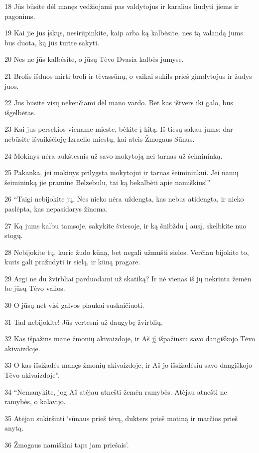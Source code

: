 \par 18 Jūs būsite dėl manęs vedžiojami pas valdytojus ir karalius liudyti jiems ir pagonims. 
\par 19 Kai jie jus įskųs, nesirūpinkite, kaip arba ką kalbėsite, nes tą valandą jums bus duota, ką jūs turite sakyti. 
\par 20 Nes ne jūs kalbėsite, o jūsų Tėvo Dvasia kalbės jumyse. 
\par 21 Brolis išduos mirti brolį ir tėvas­sūnų, o vaikai sukils prieš gimdytojus ir žudys juos. 
\par 22 Jūs būsite visų nekenčiami dėl mano vardo. Bet kas ištvers iki galo, bus išgelbėtas. 
\par 23 Kai jus persekios viename mieste, bėkite į kitą. Iš tiesų sakau jums: dar nebūsite išvaikščioję Izraelio miestų, kai ateis Žmogaus Sūnus. 
\par 24 Mokinys nėra aukštesnis už savo mokytoją nei tarnas už šeimininką. 
\par 25 Pakanka, jei mokinys prilygsta mokytojui ir tarnas šeimininkui. Jei namų šeimininką jie praminė Belzebulu, tai ką bekalbėti apie namiškius!” 
\par 26 “Taigi nebijokite jų. Nes nieko nėra uždengta, kas nebus atidengta, ir nieko paslėpta, kas nepasidarys žinoma. 
\par 27 Ką jums kalbu tamsoje, sakykite šviesoje, ir ką šnibždu į ausį, skelbkite nuo stogų. 
\par 28 Nebijokite tų, kurie žudo kūną, bet negali užmušti sielos. Verčiau bijokite to, kuris gali pražudyti ir sielą, ir kūną pragare. 
\par 29 Argi ne du žvirbliai parduodami už skatiką? Ir nė vienas iš jų nekrinta žemėn be jūsų Tėvo valios. 
\par 30 O jūsų net visi galvos plaukai suskaičiuoti. 
\par 31 Tad nebijokite! Jūs vertesni už daugybę žvirblių. 
\par 32 Kas išpažins mane žmonių akivaizdoje, ir Aš jį išpažinsiu savo dangiškojo Tėvo akivaizdoje. 
\par 33 O kas išsižadės manęs žmonių akivaizdoje, ir Aš jo išsižadėsiu savo dangiškojo Tėvo akivaizdoje”. 
\par 34 “Nemanykite, jog Aš atėjau atnešti žemėn ramybės. Atėjau atnešti ne ramybės, o kalavijo. 
\par 35 Atėjau sukiršinti ‘sūnaus prieš tėvą, dukters prieš motiną ir marčios prieš anytą. 
\par 36 Žmogaus namiškiai taps jam priešais’. 

